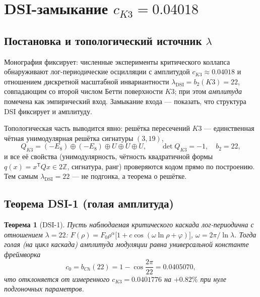 \documentclass[11pt,a4paper]{article}
\theoremstyle{plain}
\newtheorem{theorem}{Теорема}[section]
\theoremstyle{definition}
\theoremstyle{remark}
\begin{document}
\section{DSI-замыкание $c_{K3}=0.04018$}\label{sec:dsi}

\subsection{Постановка и топологический источник $\lambda$}

Монография фиксирует: численные эксперименты критического коллапса обнаруживают
лог-периодические осцилляции с амплитудой $c_{K3}\approx0.04018$ и отношением
дискретной масштабной инвариантности $\lambda_{\mathrm{DSI}}=b_2(K3)=22$,
совпадающим со второй числом Бетти поверхности $K3$; при этом \emph{амплитуда}
помечена как эмпирический вход. Замыкание входа --- показать, что структура DSI
фиксирует и амплитуду.

Топологическая часть выводится явно: решётка пересечений $K3$ ---
единственная чётная унимодулярная решётка сигнатуры $(3,19)$,
\begin{equation}
  Q_{K3}=(-E_8)\oplus(-E_8)\oplus U\oplus U\oplus U,\qquad
  \det Q_{K3}=-1,\quad b_2=22,
\end{equation}
и все её свойства (унимодулярность, чётность квадратичной формы
$q(x)=x^{\mathsf T}Qx\in2\mathbb Z$, сигнатура, ранг) проверяются кодом прямо
по построению. Тем самым $\lambda_{\mathrm{DSI}}=22$ --- не подгонка, а
теорема о решётке.

\subsection{Теорема DSI-1 (голая амплитуда)}

\begin{theorem}[DSI-1]\label{th:dsi1}
Пусть наблюдаемая критического каскада лог-периодична с отношением
$\lambda=22$: $F(\rho)=F_0\rho^{\alpha}\bigl[1+c\cos(\omega\ln\rho+\varphi)\bigr]$,
$\omega=2\pi/\ln\lambda$. Тогда голая (на цикл каскада) амплитуда модуляции
равна универсальной константе фреймворка
\begin{equation}
  c_0=b_{Ch}(22)=1-\cos\frac{2\pi}{22}=0.0405070,
\end{equation}
что отклоняется от измеренного $c_{K3}=0.0401776$ на $+0.82\%$ при нуле
подгоночных параметров.
\end{theorem}
\end{document}
